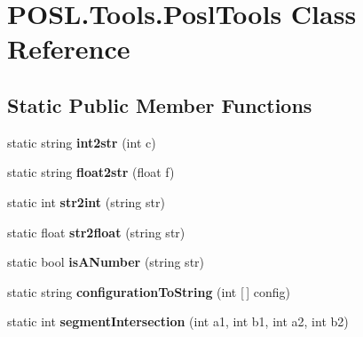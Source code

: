 \hypertarget{classPOSL_1_1Tools_1_1PoslTools}{}\section{P\+O\+S\+L.\+Tools.\+Posl\+Tools Class Reference}
\label{classPOSL_1_1Tools_1_1PoslTools}
\subsection*{Static Public Member Functions}
\begin{DoxyCompactItemize}
\item 
\mbox{\label{classPOSL_1_1Tools_1_1PoslTools_ab6d5945e8fa1685e00222c18ffd2ea30}} 
static string {\bfseries int2str} (int c)
\item 
\mbox{\label{classPOSL_1_1Tools_1_1PoslTools_a9e5a729c3944625f172a8c88fefb4c05}} 
static string {\bfseries float2str} (float f)
\item 
\mbox{\label{classPOSL_1_1Tools_1_1PoslTools_ac60a0c53be828bc5e366e45900440e6e}} 
static int {\bfseries str2int} (string str)
\item 
\mbox{\label{classPOSL_1_1Tools_1_1PoslTools_a56814f7ad78592c09d42c05dd5047e0e}} 
static float {\bfseries str2float} (string str)
\item 
\mbox{\label{classPOSL_1_1Tools_1_1PoslTools_a6195a40bd9a17356b9367932a7ff9e47}} 
static bool {\bfseries is\+A\+Number} (string str)
\item 
\mbox{\label{classPOSL_1_1Tools_1_1PoslTools_aff2fafbbd1e0b42875729cf11efe188e}} 
static string {\bfseries configuration\+To\+String} (int \mbox{[}$\,$\mbox{]} config)
\item 
\mbox{\label{classPOSL_1_1Tools_1_1PoslTools_a2214dbd083cc90f6240573fd51948391}} 
static int {\bfseries segment\+Intersection} (int a1, int b1, int a2, int b2)
\item 
\mbox{\label{classPOSL_1_1Tools_1_1PoslTools_af5add9c1ff2937402d79883ecc375539}} 

\end{DoxyCompactItemize}
